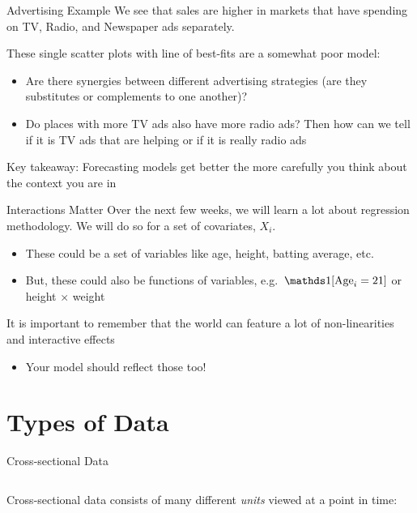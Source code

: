 \documentclass[aspectratio=169,t,11pt,table]{beamer}
\begin{document}
\begin{frame}{Advertising Example}
  We see that sales are higher in markets that have spending on TV, Radio, and Newspaper ads separately. 
  
  \pause
  \bigskip 
  These single scatter plots with line of best-fits are a somewhat poor model:
  \begin{itemize}
    \item Are there synergies between different advertising strategies (are they substitutes or complements to one another)?

    \item Do places with more TV ads also have more radio ads? Then how can we tell if it is TV ads that are helping or if it is really radio ads 
  \end{itemize}

  \pause\bigskip
  \alert{Key takeaway:} Forecasting models get better the more carefully you think about the context you are in
\end{frame}

\begin{frame}{Interactions Matter}
  Over the next few weeks, we will learn a lot about regression methodology. We will do so for a set of covariates, $X_i$. 
  \begin{itemize}
    \item These could be a set of variables like age, height, batting average, etc.
    \item But, these could also be functions of variables, e.g. $\one{\text{Age}_i = 21}$ or height $\times$ weight
  \end{itemize}

  \bigskip
  It is important to remember that the world can feature a lot of non-linearities and interactive effects
  \begin{itemize}
    \item Your model should reflect those too! 
  \end{itemize}
\end{frame}





\section{Types of Data}

\begin{frame}{Cross-sectional Data}
  
  \begin{columns}[T]
    \begin{column}{.4\textwidth}
      \alert{Cross-sectional data} consists of many different \emph{units} viewed at a point in time:
    \end{column}
    \begin{column}{.6\textwidth}
      \vspace*{-\bigskipamount}
      
    \end{column}
  \end{columns}
\end{frame}
\end{document}
